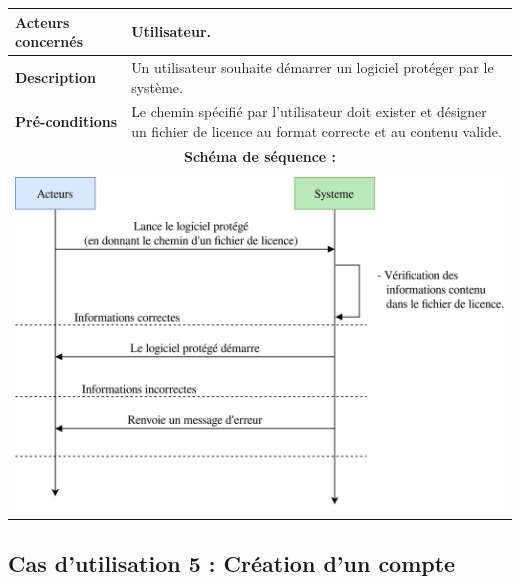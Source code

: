 \begin{table}[!h]
        \centering
        \begin{tabular}{| m{4cm} | m{12cm} |}
                \hline
		    \textbf{Acteurs concernés} & Utilisateur. \\
                \hline
		    \textbf{Description} & Un utilisateur souhaite démarrer un logiciel protéger par le système. \\
                \hline
		    \textbf{Pré-conditions} & Le chemin spécifié par l'utilisateur doit exister et désigner un fichier de licence au format correcte et au contenu valide.\\
		\hline
		    \multicolumn{2}{|c|}{\textbf{Schéma de séquence :}} \\
                \hline
                    \multicolumn{2}{|c|}{}\\
                    \multicolumn{2}{|c|}{\includegraphics[width=15cm]{main/png/seq_demarrage.png}} \\
                \hline
        \end{tabular}
        \label{tab:tab4}
\end{table}
\newpage

\subsection{Cas d'utilisation 5 : Création d'un compte}

